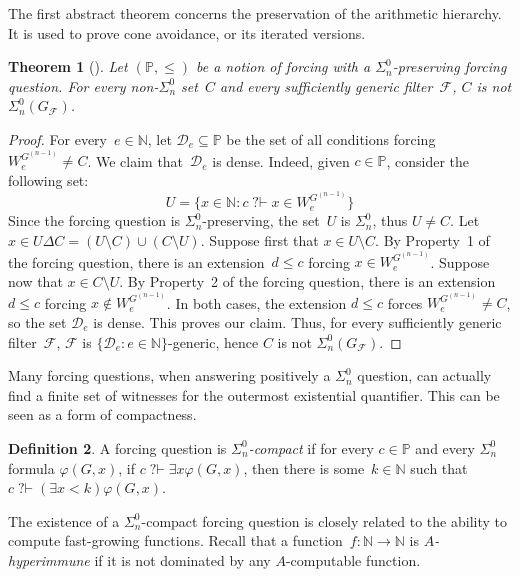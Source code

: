 \documentclass{article}
\def\NN{\mathbb{N}}
\def\PP{\mathbb{P}}
\def\F{\mathcal{F}}
\def\D{\mathcal{D}}
\def\PP{\mathbb{P}}
\newcommand{\qvdash}{\operatorname{{?}{\vdash}}}
\newtheorem{theorem}{Theorem}
\numberwithin{theorem}{section}
\theoremstyle{definition}
\newtheorem{definition}[theorem]{Definition}
\begin{document}
The first abstract theorem concerns the preservation of the arithmetic hierarchy. It is used to prove cone avoidance, or its iterated versions.

\begin{theorem}[\cite{monin201pigeons}]\label{thm:abstract-preserving-definitions}
Let $(\PP, \leq)$ be a notion of forcing with a $\Sigma^0_n$-preserving forcing question.
For every non-$\Sigma^0_n$ set~$C$ and every sufficiently generic filter~$\F$, $C$ is not $\Sigma^0_n(G_\F)$.
\end{theorem}
\begin{proof}
For every~$e \in \NN$, let $\D_e \subseteq \PP$ be the set of all conditions forcing $W_e^{G^{(n-1)}} \neq C$.
We claim that~$\D_e$ is dense. Indeed, given $c \in \PP$, consider the following set:
$$
U = \{ x \in \NN : c \qvdash x \in W_e^{G^{(n-1)}} \}
$$
Since the forcing question is $\Sigma^0_n$-preserving, the set~$U$ is $\Sigma^0_n$, thus $U \neq C$.
Let $x \in U \Delta C = (U \setminus C) \cup (C \setminus U)$. Suppose first that $x \in U \setminus C$. By Property~1 of the forcing question, there is an extension~$d \leq c$ forcing $x \in W_e^{G^{(n-1)}}$.
Suppose now that $x \in C \setminus U$. By Property~2 of the forcing question, there is an extension~$d \leq c$ forcing $x \not\in W_e^{G^{(n-1)}}$.
In both cases, the extension $d \leq c$ forces $W_e^{G^{(n-1)}} \neq C$, so the set $\D_e$ is dense. This proves our claim. Thus, for every sufficiently generic filter~$\F$, $\F$ is $\{\D_e : e \in \NN\}$-generic, hence $C$ is not $\Sigma^0_n(G_\F)$.
\end{proof}

Many forcing questions, when answering positively a $\Sigma^0_n$ question, can actually find a finite set of witnesses for the outermost existential quantifier. This can be seen as a form of compactness.

\begin{definition}
A forcing question is \emph{$\Sigma^0_n$-compact} if for every $c \in \PP$ and every $\Sigma^0_n$ formula $\varphi(G, x)$, if $c \qvdash \exists x \varphi(G, x)$, then there is some~$k \in \NN$ such that $c \qvdash (\exists x < k)\varphi(G, x)$.
\end{definition}

The existence of a $\Sigma^0_n$-compact forcing question is closely related to the ability to compute fast-growing functions. Recall that a function~$f : \NN \to \NN$ is \emph{$A$-hyperimmune} if it is not dominated by any $A$-computable function.
\end{document}
